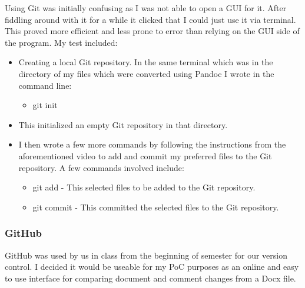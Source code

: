 \documentclass{article}
\begin{document}
Using Git was initially confusing as I was not able to open a GUI for it. After fiddling around with it for a while it clicked that I could just use it via terminal. This proved more efficient and less prone to error than relying on the GUI side of the program. My test included:

\begin{itemize}
    \item Creating a local Git repository. In the same terminal which was in the directory of my files which were converted using Pandoc I wrote in the command line:
    \begin{itemize}
        \item git init
    \end{itemize}
    \item This initialized an empty Git repository in that directory.
    \item I then wrote a few more commands by following the instructions from the aforementioned video to add and commit my preferred files to the Git repository. A few commands involved include:
    \begin{itemize}
        \item git add - This selected files to be added to the Git repository.
        \item git commit - This committed the selected files to the Git repository.
    \end{itemize}
\end{itemize}

\subsubsection{GitHub}

GitHub was used by us in class from the beginning of semester for our version control. I decided it would be useable for my PoC purposes as an online and easy to use interface for comparing document and comment changes from a Docx file.
\end{document}
